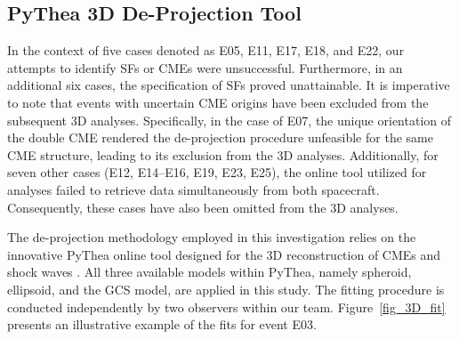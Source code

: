 \subsection{PyThea 3D De-Projection Tool}
In the context of five cases denoted as E05, E11, E17, E18, and E22, our attempts to identify SFs or CMEs were unsuccessful. Furthermore, in an additional six cases, the specification of SFs proved unattainable.
It is imperative to note that events with uncertain CME origins have been excluded from the subsequent 3D analyses. Specifically, in the case of E07, the unique orientation of the double CME rendered the de-projection procedure unfeasible for the same CME structure, leading to its exclusion from the 3D analyses. Additionally, for seven other cases (E12, E14–E16, E19, E23, E25), the online tool utilized for analyses failed to retrieve data simultaneously from both spacecraft. Consequently, these cases have also been omitted from the 3D analyses.

The de-projection methodology employed in this investigation relies on the innovative PyThea online tool designed for the 3D reconstruction of CMEs and shock waves \citep{kouloumvakos_2022}. All three available models within PyThea, namely spheroid, ellipsoid, and the GCS model, are applied in this study. The fitting procedure is conducted independently by two observers within our team. Figure~\ref{fig_3D_fit} presents an illustrative example of the fits for event E03.


